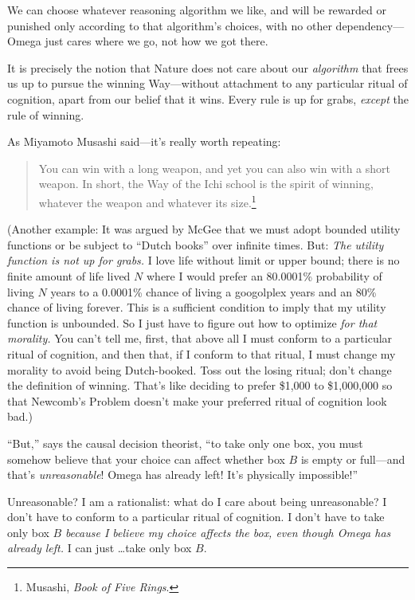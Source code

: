 {
 We can choose whatever reasoning algorithm we like, and will be
rewarded or punished only according to that algorithm's
choices, with no other dependency---Omega just cares where we go, not
how we got there.}

{
 It is precisely the notion that Nature does not care about our
\textit{algorithm} that frees us up to pursue the winning Way---without
attachment to any particular ritual of cognition, apart from our belief
that it wins. Every rule is up for grabs, \textit{except} the rule of
winning.}

{
 As Miyamoto Musashi said---it's really worth
repeating:}

\begin{quote}
{
 You can win with a long weapon, and yet you can also win with a
short weapon. In short, the Way of the Ichi school is the spirit of
winning, whatever the weapon and whatever its size.\footnote{Musashi, \textit{Book of Five Rings}.}}
\end{quote}

{
 (Another example: It was argued by McGee that we must adopt
bounded utility functions or be subject to ``Dutch
books'' over infinite times. But: \textit{The utility
function is not up for grabs.} I love life without limit or upper
bound; there is no finite amount of life lived $N$ where I would prefer
an 80.0001\% probability of living $N$ years to a 0.0001\% chance of
living a googolplex years and an 80\% chance of living forever. This is
a sufficient condition to imply that my utility function is unbounded.
So I just have to figure out how to optimize \textit{for that
morality.} You can't tell me, first, that above all I
must conform to a particular ritual of cognition, and then that, if I
conform to that ritual, I must change my morality to avoid being
Dutch-booked. Toss out the losing ritual; don't change
the definition of winning. That's like deciding to
prefer \$1,000 to \$1,000,000 so that Newcomb's Problem
doesn't make your preferred ritual of cognition look
bad.)}

{
 ``But,'' says the causal
decision theorist, ``to take only one box, you must
somehow believe that your choice can affect whether box $B$ is empty or
full---and that's \textit{unreasonable}! Omega has
already left! It's physically
impossible!''}

{
 Unreasonable? I am a rationalist: what do I care about being
unreasonable? I don't have to conform to a particular
ritual of cognition. I don't have to take only box $B$
\textit{because I believe my choice affects the box, even though Omega
has already left.} I can just \ldots take only box $B$.}

